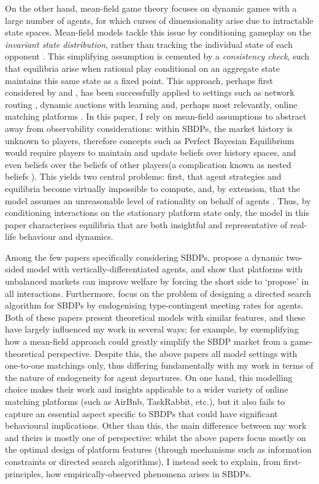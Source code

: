 On the other hand, mean-field game theory focuses on dynamic games with a large number of agents, for which curses of dimensionality arise due to intractable state spaces. 
Mean-field models tackle this issue by conditioning gameplay on the \textit{invariant state distribution}, rather than tracking the individual state of each opponent \citep{light2022mean}.
This simplifying assumption is cemented by a \textit{consistency check}, such that equilibria arise when rational play conditional on an aggregate state maintains this same state as a fixed point. 
This approach, perhaps first considered by \cite{jovanovic1988anonymous} and \cite{hopenhayn1992entry}, has been successfully applied to settings such as network routing \citep{calderone2017markov}, dynamic auctions with learning \citep{iyer2014mean} and, perhaps most relevantly, online matching platforms \citep{kanoria2021facilitating,immorlica2021designing}.
In this paper, I rely on mean-field assumptions to abstract away from observability considerations: within SBDPs, the market history is unknown to players, therefore concepts such as Perfect Bayesian Equilibrium would require players to maintain and update beliefs over history spaces, and even beliefs over the beliefs of other players(a complication known as nested beliefs \citep{brandenburger1993hierarchies}).
This yields two central problems: first, that agent strategies and equilibria become virtually impossible to compute, and, by extension, that the model assumes an unreasonable level of rationality on behalf of agents \citep{iyer2014mean}.
Thus, by conditioning interactions on the stationary platform state only, the model in this paper characterises equilibria that are both insightful and representative of real-life behaviour and dynamics. 

Among the few papers specifically considering SBDPs, \cite{kanoria2021facilitating} propose a dynamic two-sided model with vertically-differentiated agents, and show that platforms with unbalanced markets can improve welfare by forcing the short side to `propose' in all interactions. 
Furthermore, \cite{immorlica2021designing} focus on the problem of designing a directed search algorithm for SBDPs by endogenising type-contingent meeting rates for agents. 
Both of these papers present theoretical models with similar features, and these have largely influenced my work in several ways; for example, by exemplifying how a mean-field approach could greatly simplify the SBDP market from a game-theoretical perspective. 
Despite this, the above papers all model settings with one-to-one matchings only, thus differing fundamentally with my work in terms of the nature of endogeneity for agent departures. On one hand, this modelling choice makes their work and insights applicable to a wider variety of online matching platforms (such as AirBnb, TaskRabbit, etc.), but it also fails to capture an essential aspect specific to SBDPs that could have significant behavioural implications. Other than this, the main difference between my work and theirs is mostly one of perspective: whilst the above papers focus mostly on the optimal design of platform features (through mechanisms such as information constraints or directed search algorithms), I instead seek to explain, from first-principles, how empirically-observed phenomena arises in SBDPs.